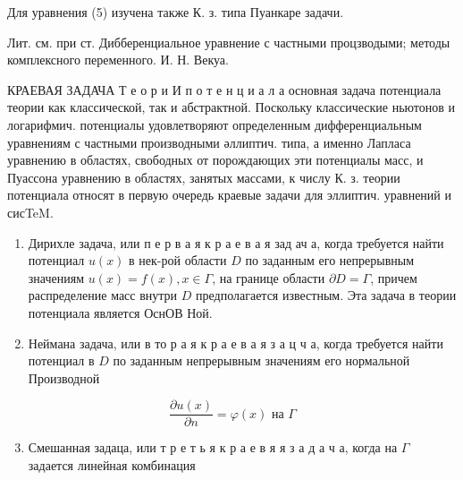 \documentclass[10pt]{article}
\begin{document}
Для уравнения (5) изучена также К. з. типа Пуанкаре задачи.



Лит. см. при ст. Дибберенциальное уравнение с частными процзводыми; методы комплексного переменного. И. Н. Векуа.



КРАЕВАЯ ЗАДАЧА Т е о р и И п о т е н ц и а л а основная задача потенциала теории как классической, так и абстрактной. Поскольку классические ньютонов и логарифмич. потенциалы удовлетворяют определенным дифференциальным уравнениям с частными производными әллиптич. типа, а именно Лапласа уравнению в областях, свободных от порождающих эти потенциалы масс, и Пуассона уравнению в областях, занятых массами, к числу К. з. теории потенциала относят в первую очередь краевые задачи для эллиптич. уравнений и сисTeM.



\begin{enumerate}

  \item Дирихле задача, или п е р в а я к р а е в а я зад ач а, когда требуется найти потенциал $u(x)$ в нек-рой области $D$ по заданным его непрерывным значениям $u(x)=f(x), x \in \Gamma$, на границе области $\partial D=\Gamma$, причем распределение масс внутри $D$ предполагается известным. Эта задача в теории потенциала является ОснОВ Ной.



  \item Неймана задача, или в то р а я к р а е в а я з а ц ч а, когда требуется найти потенциал в $D$ по заданным непрерывным значениям его нормальной Производной



\end{enumerate}



\[

\frac{\partial u(x)}{\partial n}=\varphi(x) \text { на } \Gamma

\]



\begin{enumerate}

  \setcounter{enumi}{2}

  \item Смешанная задаца, или т р е т ь я к р а е в я я з а д а ч а, когда на $\Gamma$ задается линейная комбинация

\end{enumerate}
\end{document}
